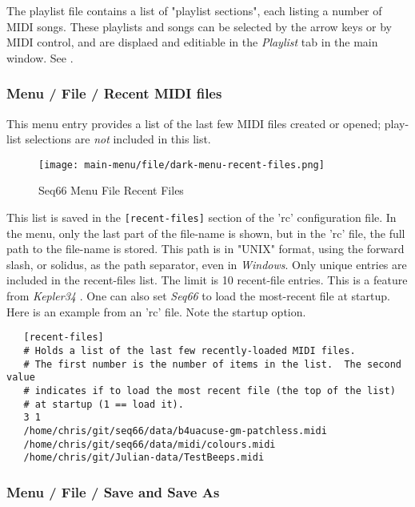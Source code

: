    The playlist file contains a list of "playlist sections",
   each listing a number of MIDI songs.
   These playlists and songs can be
   selected by the arrow keys or by MIDI control,
   and are displaed and editiable in the \textsl{Playlist} tab
   in the main window.
   See .

\subsubsection{Menu / File / Recent MIDI files}
\label{subsubsec:menu_file_recent}

   This menu entry provides a list of the last few MIDI files created or opened;
   play-list selections are \textsl{not} included in this list.

\begin{figure}[H]
   \centering 
   \texttt{[image: main-menu/file/dark-menu-recent-files.png]}
   \caption{Seq66 Menu File Recent Files}
   \label{fig:menu_file_recent_files}
\end{figure}

   This list is saved in the \texttt{[recent-files]} section of the
   'rc' configuration file.
   In the menu, only the last part of the file-name is
   shown, but in the 'rc' file,
   the full path to the file-name is stored.
   This path is in "UNIX" format, using the forward slash, or solidus,
   as the path separator, even in \textsl{Windows}.
   Only unique entries are included in the recent-files list.
   The limit is 10 recent-file entries.
   This is a feature from \textsl{Kepler34} \cite{kepler34}.
   One can also set \textsl{Seq66} to load the most-recent file at startup.
   Here is an example from an 'rc' file.  Note the startup option.

\begin{verbatim}
   [recent-files]
   # Holds a list of the last few recently-loaded MIDI files.
   # The first number is the number of items in the list.  The second value
   # indicates if to load the most recent file (the top of the list)
   # at startup (1 == load it).
   3 1
   /home/chris/git/seq66/data/b4uacuse-gm-patchless.midi
   /home/chris/git/seq66/data/midi/colours.midi
   /home/chris/git/Julian-data/TestBeeps.midi
\end{verbatim}

\subsubsection{Menu / File / Save and Save As}
\label{subsubsec:menu_file_open_save_as}

